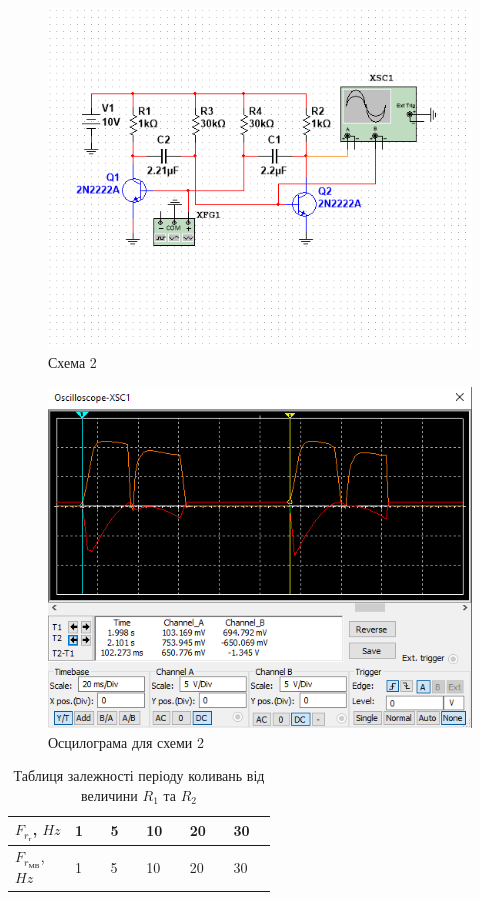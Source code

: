 \documentclass{article}
\begin{document}
\begin{normalsize}
	\begin{figure}[H]
		\centering
		\includegraphics[width=\textwidth]{3}
		\caption{Схема 2}
	\end{figure}
	
	\begin{figure}[H]
		\centering
		\includegraphics[width=\textwidth]{4}
		\caption{Осцилограма для схеми 2}
	\end{figure}
	
	\begin{table}[H]
		\centering
		\renewcommand*\arraystretch{1.3}
		\begin{tabular}{|p{0.12\linewidth}|p{0.08\linewidth}|p{0.08\linewidth}|p{0.08\linewidth}|p{0.08\linewidth}|p{0.08\linewidth}|}
			\hline
			$F_{r_{\text{г}}}$, $Hz$&1&5&10&20&30\\
			\hline
			$F_{r_{\text{МВ}}}$, $Hz$&1&5&10&20&30\\
			\hline
		\end{tabular}
		\caption{Таблиця залежності періоду коливань від величини $R_1$ та $R_2$}
	\end{table}
	

\end{normalsize}
\end{document}
